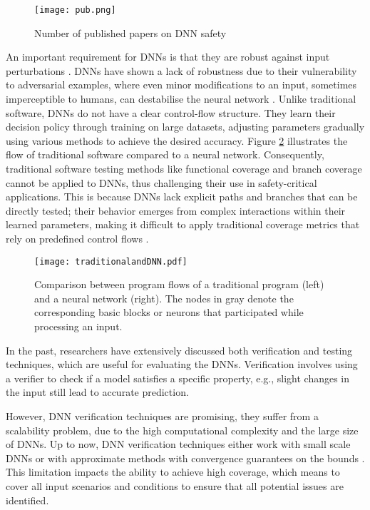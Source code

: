 \begin{figure}[tb]
  \centering
  \texttt{[image: pub.png]}
  \caption{Number of published papers on DNN safety }
  \label{fig:publish}
\end{figure}

An important requirement for DNNs is that they are robust against input perturbations \cite{HuangX}. 
DNNs have shown a lack of robustness due to their vulnerability to adversarial examples, where even minor modifications to an input, sometimes imperceptible to humans, can destabilise the neural network \cite{Goodfellow,Carlini}. Unlike traditional software, DNNs do not have a clear control-flow structure. They learn their decision policy through training on large datasets, adjusting parameters gradually using various methods to achieve the desired accuracy. Figure \ref{fig:Comparison} illustrates the flow of traditional software compared to a neural network. Consequently, traditional software testing methods like functional coverage and branch coverage  cannot be applied to DNNs, thus challenging their use in safety-critical applications. This is because DNNs lack explicit paths and branches that can be directly tested; their behavior emerges from complex interactions within their learned parameters, making it difficult to apply traditional coverage metrics that rely on predefined control flows \cite{Sekhon}.

\begin{figure}
  \centering
  \texttt{[image: traditionalandDNN.pdf]}
  \caption{Comparison between program flows of a traditional program (left) and a neural network (right). The nodes in gray denote the corresponding basic blocks or neurons that participated while processing an input.}
  \label{fig:Comparison}
\end{figure}

 In the past, researchers have extensively discussed both verification \cite{Beta-crown,verification} and testing techniques, which are useful for evaluating the DNNs. Verification involves using a verifier to check if a model satisfies a specific property, e.g., slight changes in the input still lead to accurate prediction.

However, DNN verification techniques are promising, they suffer from a scalability problem, due to the high computational complexity and the large size of DNNs. Up to now, DNN verification techniques either work with small scale DNNs or with approximate methods with convergence guarantees on the bounds \cite{HuangX}. This limitation impacts the ability to achieve high coverage, which means to cover all input scenarios and conditions to ensure that all potential issues are identified.

